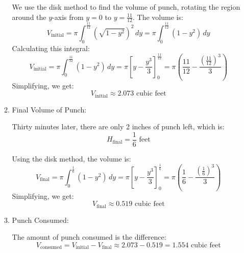 \documentclass[12pt]{article}
\begin{document}
\begin{enumerate}[start=1,label={\bfseries. },leftmargin=1in]
\begin{enumerate}
        We use the disk method to find the volume of punch, rotating the region around the \( y \)-axis from \( y = 0 \) to \( y = \frac{11}{12} \). The volume is:
        \[
        V_{\text{initial}} = \pi \int_0^{\frac{11}{12}} \left(\sqrt{1 - y^2}\right)^2 \, dy = \pi \int_0^{\frac{11}{12}} (1 - y^2) \, dy
        \]
        Calculating this integral:
        \[
        V_{\text{initial}} = \pi \int_0^{\frac{11}{12}} (1 - y^2) \, dy = \pi \left[ y - \frac{y^3}{3} \right]_0^{\frac{11}{12}} = \pi \left( \frac{11}{12} - \frac{\left(\frac{11}{12}\right)^3}{3} \right)
        \]
        Simplifying, we get:
        \[
        V_{\text{initial}} \approx 2.073 \text{ cubic feet}
        \]
        
        \item Final Volume of Punch:
        
        Thirty minutes later, there are only 2 inches of punch left, which is:
        \[
        H_{\text{final}} = \frac{1}{6} \text{ feet}
        \]
        
        Using the disk method, the volume is:
        \[
        V_{\text{final}} = \pi \int_0^{\frac{1}{6}} (1 - y^2) \, dy = \pi \left[ y - \frac{y^3}{3} \right]_0^{\frac{1}{6}} = \pi \left( \frac{1}{6} - \frac{\left(\frac{1}{6}\right)^3}{3} \right)
        \]
        Simplifying, we get:
        \[
        V_{\text{final}} \approx 0.519 \text{ cubic feet}
        \]
        
        \item Punch Consumed:
        
        The amount of punch consumed is the difference:
        \[
        V_{\text{consumed}} = V_{\text{initial}} - V_{\text{final}} \approx 2.073 - 0.519 = 1.554 \text{ cubic feet}
        \]
    \end{enumerate}
\end{enumerate}




    
\end{document}
